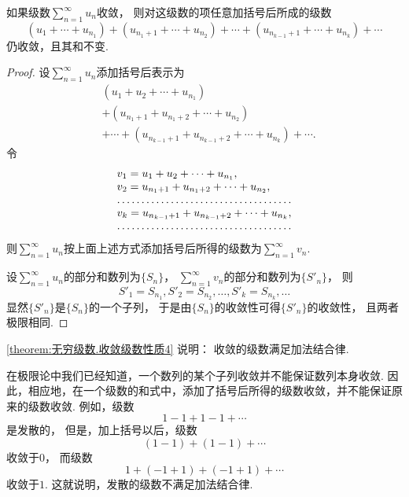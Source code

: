 \begin{property}\label{theorem:无穷级数.收敛级数性质4}
如果级数\(\sum_{n=1}^\infty u_n\)收敛，
则对这级数的项任意加括号后所成的级数\begin{equation*}
	(u_1+\dotsb+u_{n_1})
	+ (u_{n_1+1}+\dotsb+u_{n_2})
	+ \dotsb
	+ (u_{n_{k-1}+1}+\dotsb+u_{n_k}) + \dotsb
\end{equation*}仍收敛，且其和不变.
\begin{proof}
设\(\sum_{n=1}^\infty u_n\)添加括号后表示为\begin{align*}
	&(u_1 + u_2 + \dotsb + u_{n_1}) \\
	&+ (u_{n_1+1} + u_{n_1+2} + \dotsb + u_{n_2}) \\
	&+ \dotsb + (u_{n_{k-1}+1} + u_{n_{k-1}+2} + \dotsb + u_{n_k}) + \dotsb.
\end{align*}
令\begin{equation*}
	\begin{array}{l}
		v_1 = u_1 + u_2 + \dotsb + u_{n_1}, \\
		v_2 = u_{n_1+1} + u_{n_1+2} + \dotsb + u_{n_2}, \\
		\hdotsfor{1} \\
		v_k = u_{n_{k-1}+1} + u_{n_{k-1}+2} + \dotsb + u_{n_k}, \\
		\hdotsfor{1}
	\end{array}
\end{equation*}
则\(\sum_{n=1}^\infty u_n\)按上面上述方式添加括号后所得的级数为\(\sum_{n=1}^\infty v_n\).

设\(\sum_{n=1}^\infty u_n\)的部分和数列为\(\{S_n\}\)，
\(\sum_{n=1}^\infty v_n\)的部分和数列为\(\{S'_n\}\)，
则\begin{equation*}
	S'_1 = S_{n_1},
	S'_2 = S_{n_2},
	\dotsc,
	S'_k = S_{n_k},
	\dotsc
\end{equation*}
显然\(\{S'_n\}\)是\(\{S_n\}\)的一个子列，
于是由\(\{S_n\}\)的收敛性可得\(\{S'_n\}\)的收敛性，
且两者极限相同.
\end{proof}
\end{property}
\begin{remark}
\cref{theorem:无穷级数.收敛级数性质4} 说明：
收敛的级数满足加法结合律.
\end{remark}
\begin{remark}
在极限论中我们已经知道，一个数列的某个子列收敛并不能保证数列本身收敛.
因此，相应地，在一个级数的和式中，添加了括号后所得的级数收敛，并不能保证原来的级数收敛.
例如，级数\begin{equation*}
	1-1+1-1+\dotsb
\end{equation*}是发散的，
但是，加上括号以后，级数\begin{equation*}
	(1-1)+(1-1)+\dotsb
\end{equation*}收敛于\(0\)，
而级数\begin{equation*}
	1+(-1+1)+(-1+1)+\dotsb
\end{equation*}收敛于\(1\).
这就说明，发散的级数不满足加法结合律.
\end{remark}
